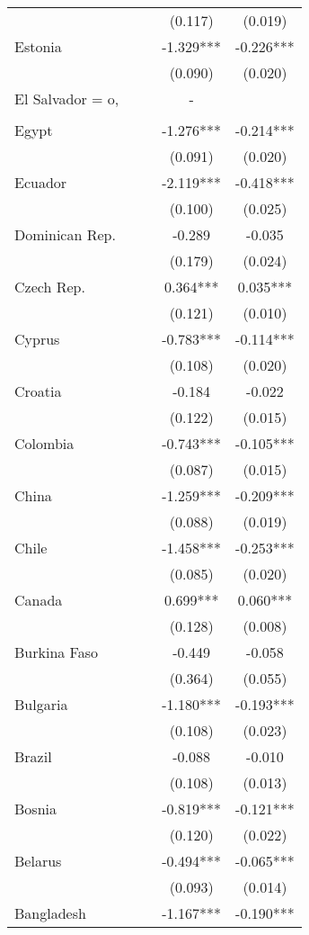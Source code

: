 \documentclass[]{article}
\begin{document}
\begin{tabular}{lcccc}
 &  &  & (0.117) & (0.019) \\
Estonia &  &  & -1.329*** & -0.226*** \\
 &  &  & (0.090) & (0.020) \\
El Salvador = o, &  &  & - &  \\
 &  &  &  &  \\
Egypt &  &  & -1.276*** & -0.214*** \\
 &  &  & (0.091) & (0.020) \\
Ecuador &  &  & -2.119*** & -0.418*** \\
 &  &  & (0.100) & (0.025) \\
Dominican Rep. &  &  & -0.289 & -0.035 \\
 &  &  & (0.179) & (0.024) \\
Czech Rep. &  &  & 0.364*** & 0.035*** \\
 &  &  & (0.121) & (0.010) \\
Cyprus &  &  & -0.783*** & -0.114*** \\
 &  &  & (0.108) & (0.020) \\
Croatia &  &  & -0.184 & -0.022 \\
 &  &  & (0.122) & (0.015) \\
Colombia &  &  & -0.743*** & -0.105*** \\
 &  &  & (0.087) & (0.015) \\
China &  &  & -1.259*** & -0.209*** \\
 &  &  & (0.088) & (0.019) \\
Chile &  &  & -1.458*** & -0.253*** \\
 &  &  & (0.085) & (0.020) \\
Canada &  &  & 0.699*** & 0.060*** \\
 &  &  & (0.128) & (0.008) \\
Burkina Faso &  &  & -0.449 & -0.058 \\
 &  &  & (0.364) & (0.055) \\
Bulgaria &  &  & -1.180*** & -0.193*** \\
 &  &  & (0.108) & (0.023) \\
Brazil &  &  & -0.088 & -0.010 \\
 &  &  & (0.108) & (0.013) \\
Bosnia &  &  & -0.819*** & -0.121*** \\
 &  &  & (0.120) & (0.022) \\
Belarus &  &  & -0.494*** & -0.065*** \\
 &  &  & (0.093) & (0.014) \\
Bangladesh &  &  & -1.167*** & -0.190*** \\

\end{tabular}
\end{document}
